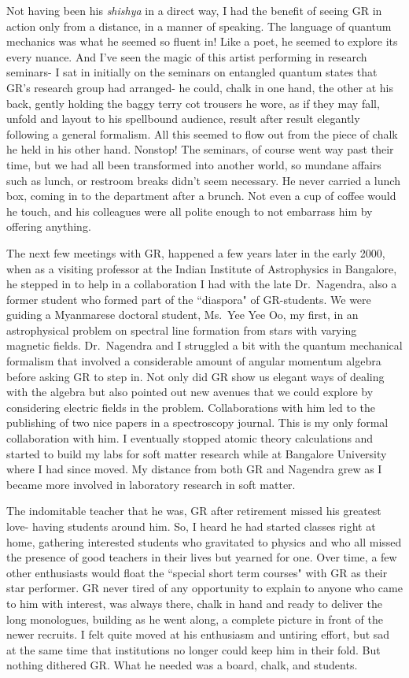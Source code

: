 Not having been his \textit{shishya} in a direct way, I had the benefit of seeing GR in action only from a distance, in a manner of speaking. The language of quantum mechanics was what he seemed so fluent in! Like a poet, he seemed to explore its every nuance. And I've seen the magic of this artist performing in research seminars- I sat in initially on the seminars on entangled quantum states that GR's research group had arranged- he could, chalk in one hand, the other at his back, gently holding the baggy terry cot trousers he wore, as if they may fall, unfold and layout to his spellbound audience, result after result elegantly following a general formalism. All this seemed to flow out from the piece of chalk he held in his other hand. Nonstop!  The seminars, of course went way past their time, but we had all been transformed into another world, so mundane affairs such as lunch, or restroom breaks didn't seem necessary. He never carried a lunch box, coming in to the department after a brunch. Not even a cup of coffee would he touch, and his colleagues were all polite enough to not embarrass him by offering anything. 

The next few meetings with GR, happened a few years later in the early 2000, when as a visiting professor at the Indian Institute of Astrophysics in Bangalore, he stepped in to help in a collaboration I had with the late Dr.\ Nagendra, also a former student who formed part of the ``diaspora" of GR-students. We were guiding a Myanmarese doctoral student, Ms.\ Yee Yee Oo, my first, in an astrophysical problem on spectral line formation from stars with varying magnetic fields. Dr.\ Nagendra and I struggled a bit with the quantum mechanical formalism that involved a considerable amount of angular momentum algebra before asking GR to step in. Not only did GR show us elegant ways of dealing with the algebra but also pointed out new avenues that we could explore by considering electric fields in the problem. Collaborations with him led to the publishing of two nice papers in a spectroscopy journal. This is my only formal collaboration with him. I eventually stopped atomic theory calculations and started to build my labs for soft matter research while at Bangalore University where I had since moved. My distance from both GR and Nagendra grew as I became more involved in laboratory research in soft matter. 

The indomitable teacher that he was, GR after retirement missed his greatest love- having students around him. So, I heard he had started classes right at home, gathering interested students who gravitated to physics and who all missed the presence of good teachers in their lives but yearned for one. Over time, a few other enthusiasts would float the ``special short term courses" with GR as their star performer. GR never tired of any opportunity to explain to anyone who came to him with interest, was always there, chalk in hand and ready to deliver the long monologues, building as he went along, a complete picture in front of the newer recruits. I felt quite moved at his enthusiasm and untiring effort, but sad at the same time that institutions no longer could keep him in their fold. But nothing dithered GR. What he needed was a board, chalk, and students.

